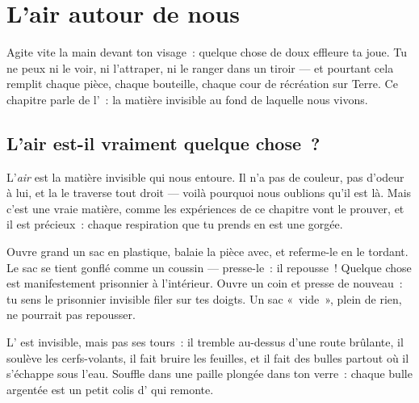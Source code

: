 \chapter{L'air autour de nous}\label{ch:g2:air-around-us}

Agite vite la main devant ton visage~: quelque chose de doux effleure
ta joue. Tu ne peux ni le voir, ni l'attraper, ni le ranger dans un
tiroir --- et pourtant cela remplit chaque pièce, chaque bouteille,
chaque cour de récréation sur Terre. Ce chapitre parle de l'~: la
matière invisible au fond de laquelle nous vivons.

\section{L'air est-il vraiment quelque chose~?}

\begin{definition}[L'air]\label{def:g2:air-around-us:air}
L'\emph{air} est la matière invisible qui nous entoure. Il
n'a pas de couleur, pas d'odeur à lui, et la  le traverse tout
droit --- voilà pourquoi nous oublions qu'il est là. Mais c'est une
vraie matière, comme les expériences de ce chapitre vont le prouver,
et il est précieux~: chaque respiration que tu prends en est une
gorgée.
\end{definition}

\begin{example}\label{ex:g2:air-around-us:catch}
Ouvre grand un sac en plastique, balaie la pièce avec, et referme-le
en le tordant. Le sac se tient gonflé comme un coussin ---
presse-le~: il repousse~! Quelque chose est manifestement prisonnier
à l'intérieur. Ouvre un coin et presse de nouveau~: tu sens le
prisonnier invisible filer sur tes doigts. Un sac «~vide~», plein de
rien, ne pourrait pas repousser.
\end{example}

\begin{example}\label{ex:g2:air-around-us:shows}
L' est invisible, mais pas ses tours~: il tremble au-dessus d'une
route brûlante, il soulève les cerfs-volants, il fait bruire les
feuilles, et il fait des bulles partout où il s'échappe sous l'eau.
Souffle dans une paille plongée dans ton verre~: chaque bulle
argentée est un petit colis d' qui remonte.
\end{example}

